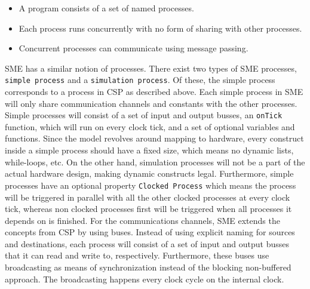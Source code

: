 \documentclass[a4paper, openany]{book}
\begin{document}
\begin{itemize}
\item A program consists of a set of named processes.
\item Each process runs concurrently with no form of sharing with other processes.
\item Concurrent processes can communicate using message passing.
\end{itemize}

SME has a similar notion of processes. There exist two types of SME processes, \texttt{simple process} and a \texttt{simulation process}. Of these, the simple process corresponds to a process in CSP as described above. Each simple process in SME will only share communication channels and constants with the other processes. Simple processes will consist of a set of input and output busses, an \texttt{onTick} function, which will run on every clock tick, and a set of optional variables and functions. Since the model revolves around mapping to hardware, every construct inside a simple process should have a fixed size, which means no dynamic lists, while-loops, etc. On the other hand, simulation processes will not be a part of the actual hardware design, making dynamic constructs legal. Furthermore, simple processes have an optional property \texttt{Clocked Process} which means the process will be triggered in parallel with all the other clocked processes at every clock tick, whereas non clocked processes first will be triggered when all processes it depends on is finished.
For the communications channels, SME extends the concepts from CSP by using buses. Instead of using explicit naming for sources and destinations, each process will consist of a set of input and output busses that it can read and write to, respectively. Furthermore, these buses use broadcasting as means of synchronization instead of the blocking non-buffered approach.  The broadcasting happens every clock cycle on the internal clock.
\end{document}
